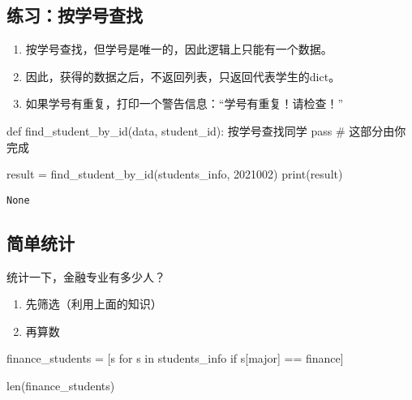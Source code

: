 \documentclass[
  letterpaper,
  DIV=11,
  numbers=noendperiod]{scrreprt}
\newenvironment{Shaded}{\begin{snugshade}}{\end{snugshade}}
\newcommand{\BuiltInTok}[1]{\textcolor[rgb]{0.00,0.23,0.31}{#1}}
\newcommand{\CommentTok}[1]{\textcolor[rgb]{0.37,0.37,0.37}{#1}}
\newcommand{\ControlFlowTok}[1]{\textcolor[rgb]{0.00,0.23,0.31}{#1}}
\newcommand{\DecValTok}[1]{\textcolor[rgb]{0.68,0.00,0.00}{#1}}
\newcommand{\KeywordTok}[1]{\textcolor[rgb]{0.00,0.23,0.31}{#1}}
\newcommand{\NormalTok}[1]{\textcolor[rgb]{0.00,0.23,0.31}{#1}}
\newcommand{\OperatorTok}[1]{\textcolor[rgb]{0.37,0.37,0.37}{#1}}
\newcommand{\StringTok}[1]{\textcolor[rgb]{0.13,0.47,0.30}{#1}}
\providecommand{\tightlist}{%
  \setlength{\itemsep}{0pt}\setlength{\parskip}{0pt}}\usepackage{longtable,booktabs,array}
\begin{document}
\hypertarget{ux7ec3ux4e60ux6309ux5b66ux53f7ux67e5ux627e}{%
\subsection{练习：按学号查找}\label{ux7ec3ux4e60ux6309ux5b66ux53f7ux67e5ux627e}}

\begin{enumerate}
\def\labelenumi{\arabic{enumi}.}
\tightlist
\item
  按学号查找，但学号是唯一的，因此逻辑上只能有一个数据。
\item
  因此，获得的数据之后，不返回列表，只返回代表学生的dict。
\item
  如果学号有重复，打印一个警告信息：``学号有重复！请检查！''
\end{enumerate}

\begin{Shaded}
\begin{Highlighting}[]
\KeywordTok{def}\NormalTok{ find\_student\_by\_id(data, student\_id):}
  \CommentTok{\textquotesingle{}\textquotesingle{}\textquotesingle{}}
\CommentTok{  按学号查找同学}
\CommentTok{  \textquotesingle{}\textquotesingle{}\textquotesingle{}}
  \ControlFlowTok{pass} \CommentTok{\# 这部分由你完成}

\NormalTok{result }\OperatorTok{=}\NormalTok{ find\_student\_by\_id(students\_info, }\DecValTok{2021002}\NormalTok{)}
\BuiltInTok{print}\NormalTok{(result)}
\end{Highlighting}
\end{Shaded}

\begin{verbatim}
None
\end{verbatim}

\hypertarget{ux7b80ux5355ux7edfux8ba1}{%
\subsection{简单统计}\label{ux7b80ux5355ux7edfux8ba1}}

统计一下，金融专业有多少人？

\begin{enumerate}
\def\labelenumi{\arabic{enumi}.}
\tightlist
\item
  先筛选（利用上面的知识）
\item
  再算数
\end{enumerate}

\begin{Shaded}
\begin{Highlighting}[]
\NormalTok{finance\_students }\OperatorTok{=}\NormalTok{ [s }\ControlFlowTok{for}\NormalTok{ s }\KeywordTok{in}\NormalTok{ students\_info }\ControlFlowTok{if}\NormalTok{ s[}\StringTok{\textquotesingle{}major\textquotesingle{}}\NormalTok{] }\OperatorTok{==} \StringTok{\textquotesingle{}finance\textquotesingle{}}\NormalTok{]}

\BuiltInTok{len}\NormalTok{(finance\_students)}
\end{Highlighting}
\end{Shaded}
\end{document}
